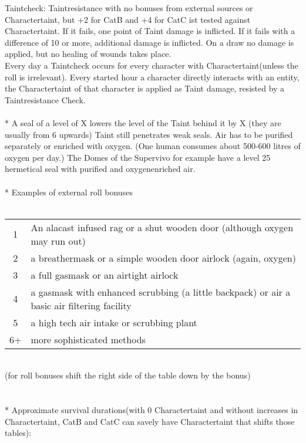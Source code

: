 \documentclass{article}
\begin{document}
    Taintcheck:  Taintresistance with no bonuses from external sources or Charactertaint, but +2 for CatB and +4 for CatC
    ist tested against Charactertaint. If it fails, one point of Taint damage is inflicted. If it fails with a
    difference of 10 or more, additional damage is inflicted. On a draw no damage is applied, but no healing of wounds takes
    place.\\
    Every day a Taintcheck occurs for every character with Charactertaint(unless the roll is irrelevant).
    Every started hour a character directly interacts with an entity, the Charactertaint of that character is
    applied as Taint damage, resisted by a Taintresistance Check.\\\\*
    A seal of a level of X lowers the level of the Taint behind it by X (they are usually from 6 upwards)
    Taint still penetrates weak seals. Air has to be purified separately or enriched with oxygen.
    (One human consumes about 500-600 litres of oxygen per day.) The Domes of the Supervivo for
    example have a level 25 hermetical seal with purified and oxygenenriched air.\\\\*
    Examples of external roll bonuses \\\\
    \begin{tabular}{cl}
        1& An alacast infused rag or a shut wooden door (although oxygen may run out)\\
        2& a breathermask or a simple wooden door airlock (again, oxygen)\\
        3& a full gasmask  or an airtight airlock\\
        4& a gasmask with enhanced scrubbing (a little backpack) or air a basic air filtering facility\\
        5& a high tech air intake or scrubbing plant\\
        6+& more sophisticated methods\\
    \end{tabular}\\(for roll bonuses shift the right side of the table down by the bonus)\\\\\\*
    Approximate survival durations(with 0 Charactertaint and without increases in Charactertaint, CatB and CatC can savely
    have Charactertaint that shifts those tables):\\\\
\end{document}
